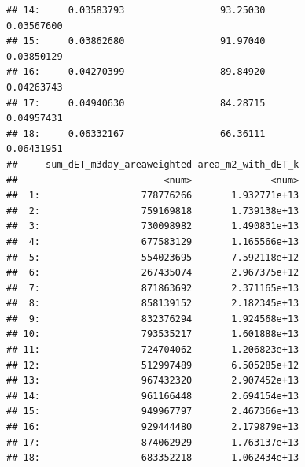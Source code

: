 \documentclass[
  11pt,
]{article}
\begin{document}
\begin{verbatim}
## 14:     0.03583793                 93.25030                  0.03567600
## 15:     0.03862680                 91.97040                  0.03850129
## 16:     0.04270399                 89.84920                  0.04263743
## 17:     0.04940630                 84.28715                  0.04957431
## 18:     0.06332167                 66.36111                  0.06431951
##     sum_dET_m3day_areaweighted area_m2_with_dET_k
##                          <num>              <num>
##  1:                  778776266       1.932771e+13
##  2:                  759169818       1.739138e+13
##  3:                  730098982       1.490831e+13
##  4:                  677583129       1.165566e+13
##  5:                  554023695       7.592118e+12
##  6:                  267435074       2.967375e+12
##  7:                  871863692       2.371165e+13
##  8:                  858139152       2.182345e+13
##  9:                  832376294       1.924568e+13
## 10:                  793535217       1.601888e+13
## 11:                  724704062       1.206823e+13
## 12:                  512997489       6.505285e+12
## 13:                  967432320       2.907452e+13
## 14:                  961166448       2.694154e+13
## 15:                  949967797       2.467366e+13
## 16:                  929444480       2.179879e+13
## 17:                  874062929       1.763137e+13
## 18:                  683352218       1.062434e+13
\end{verbatim}
\end{document}
